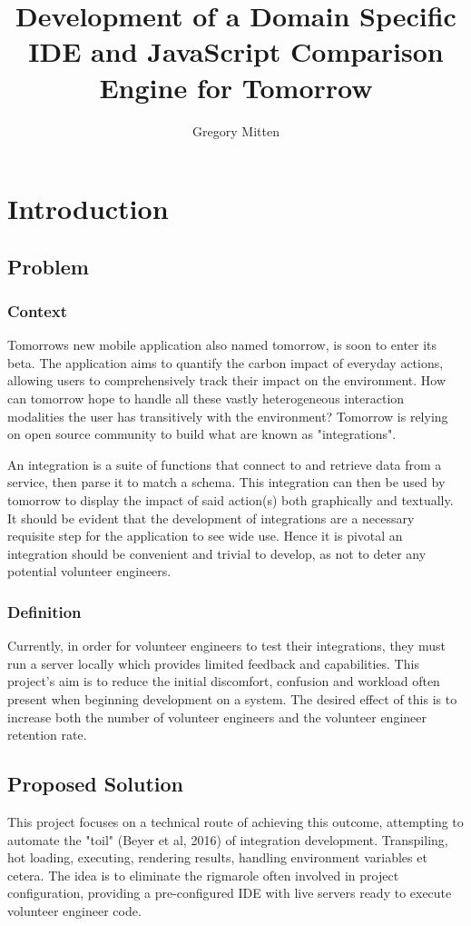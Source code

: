 \documentclass[jou,apacite]{apa6}
\title{Development of a Domain Specific IDE and JavaScript Comparison Engine for Tomorrow}
\author{Gregory Mitten}
\affiliation{University of Sussex}
\begin{document}
\maketitle    
                        
\section{Introduction}
\subsection{Problem}
\subsubsection{Context}
Tomorrow\textquotesingle s new mobile application also named tomorrow, is soon to enter its beta. The application aims to quantify the carbon impact of everyday actions, allowing users to comprehensively track their impact on the environment. How can tomorrow hope to handle all these vastly heterogeneous interaction modalities the user has transitively with the environment? Tomorrow is relying on open source community to build what are known as "integrations".

An integration is a suite of functions that connect to and retrieve data from a service, then parse it to match a schema. This integration can then be used by tomorrow to display the impact of said action(s) both graphically and textually. It should be evident that the development of integrations are a necessary requisite step for the application to see wide use. Hence it is pivotal an integration should be convenient and trivial to develop, as not to deter any potential volunteer engineers.
\subsubsection{Definition}
Currently, in order for volunteer engineers to test their integrations, they must run a server locally which provides limited feedback and capabilities. This project’s aim is to reduce the initial discomfort, confusion and workload often present when beginning development on a system. The desired effect of this is to increase both the number of volunteer engineers and the volunteer engineer retention rate.

\subsection{Proposed Solution}
This project focuses on a technical route of achieving this outcome, attempting to automate the "toil" (Beyer et al, 2016) of integration development.  Transpiling, hot loading, executing, rendering results, handling environment variables et cetera. The idea is to eliminate the rigmarole often involved in project configuration, providing a pre-configured IDE with live servers ready to execute volunteer engineer code. 
\end{document}
